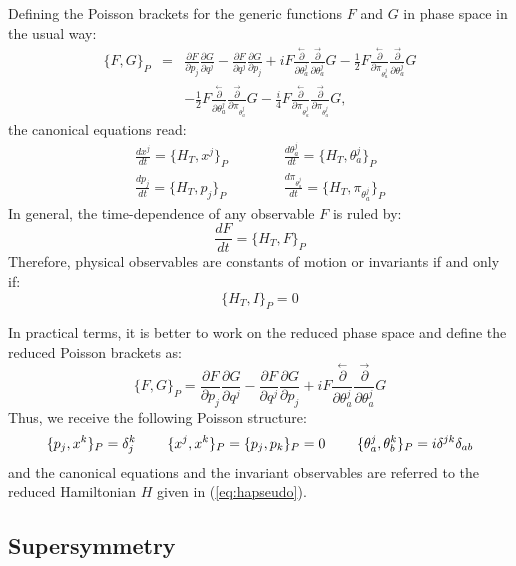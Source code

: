 \documentclass[a4paper,11pt,twoside]{article}
\begin{document}
Defining the Poisson brackets for the generic functions $F$ and
$G$ in phase space in the usual way:
\begin{eqnarray*}
\{F,G\}_P & =& \frac{\partial F}{\partial p_j}\frac{\partial
G}{\partial q^j}-\frac{\partial F}{\partial q^j} \frac{\partial
G}{\partial p_j}+i F
\frac{\stackrel{\leftarrow}{\partial}}{\partial \theta_a^j}
\frac{\stackrel{\rightarrow}{\partial}}{\partial \theta_a^j}G-
\frac{1}{2} F \frac{\stackrel{\leftarrow}{\partial}}{\partial
\pi_{\theta_a^j}} \frac{\stackrel{\rightarrow}{\partial}}{\partial
\theta_a^j} G \\ & & -\frac{1}{2} F
\frac{\stackrel{\leftarrow}{\partial}}{\partial \theta_a^j}
\frac{\stackrel{\rightarrow}{\partial}}{\partial \pi_{\theta_a^j}}
G-\frac{i}{4} F \frac{\stackrel{\leftarrow}{\partial}}{\partial
\pi_{\theta_a^j}} \frac{\stackrel{\rightarrow}{\partial}}{\partial
\pi_{\theta_a^j}}  G ,
\end{eqnarray*}
the canonical equations read:
\[
\begin{array}{lcl}
\displaystyle\frac{d x^j}{d t}= \{H_T,x^j\}_P & \hspace{1cm} &
\displaystyle\frac{d \theta_a^j}{d t}= \{H_T,\theta_a^j\}_P
\\[0.3cm] \displaystyle\frac{d p_j}{d t}= \{H_T,p_j\}_P  & &
\displaystyle\frac{d \displaystyle\pi_{\theta_a^j}}{d t}=
\{H_T,\displaystyle\pi_{\theta_a^j}\}_P
\end{array}
\]
In general, the time-dependence of any observable $F$ is ruled by:
\[
\displaystyle\frac{d F}{d t}= \{H_T,F\}_P
\]
Therefore, physical observables are constants of motion or
invariants if and only if:
\[
\{H_T,I\}_P=0
\]

In practical terms, it is better to work on the reduced phase
space and define the reduced Poisson brackets as:
\[
\{F,G\}_P =\frac{\partial F}{\partial p_j}\frac{\partial
G}{\partial q^j}-\frac{\partial F}{\partial q^j} \frac{\partial
G}{\partial p_j}+i F
\frac{\stackrel{\leftarrow}{\partial}}{\partial \theta_a^j}
\frac{\stackrel{\rightarrow}{\partial}}{\partial \theta_a^j}G
\]
Thus, we receive the following Poisson structure:
\[
\{p_j,x^k\}_P=\delta_j^k \hspace{0.8cm} \{x^j,x^k\}_P=\{p_j,p_k\}_P=0 \hspace{0.8cm}
\{\theta_a^j, \theta_b^k\}_P=i \delta^{jk} \delta_{a b}
\]
and the canonical equations and the invariant observables are
referred to the reduced Hamiltonian $H$ given in (\ref{eq:hapseudo}).

\subsection{Supersymmetry}
\end{document}
